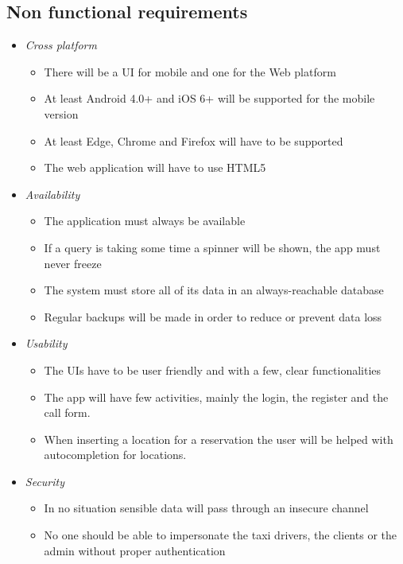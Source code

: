 \documentclass{article}
\begin{document}
\subsection{Non functional requirements}
\begin{itemize}
	\item \textit{Cross platform} %
		\begin{itemize}
			\item There will be a UI for mobile and one for the Web platform 
			\item At least Android 4.0+ and iOS 6+ will be supported for the mobile version 
			\item At least Edge, Chrome and Firefox will have to be supported
			\item The web application will have to use HTML5 %
		\end{itemize}
	\item \textit{Availability}
		\begin{itemize}
			\item The application must always be available
			\item If a query is taking some time a spinner will be shown, the app must never freeze %
			\item The system must store all of its data in an always-reachable database
			\item Regular backups will be made in order to reduce or prevent data loss
		\end{itemize}
	\item \textit{Usability} %
		\begin{itemize}
			\item The UIs have to be user friendly and with a few, clear functionalities
			\item The app will have few activities, mainly the login, the register and the call form.
			\item When inserting a location for a reservation the user will be helped with autocompletion for locations.
		\end{itemize}
	\item \textit{Security}
		\begin{itemize}
			\item In no situation sensible data will pass through an insecure channel
			\item No one should be able to impersonate the taxi drivers, the clients or the admin without proper authentication %
		\end{itemize}
\end{itemize}
\end{document}
